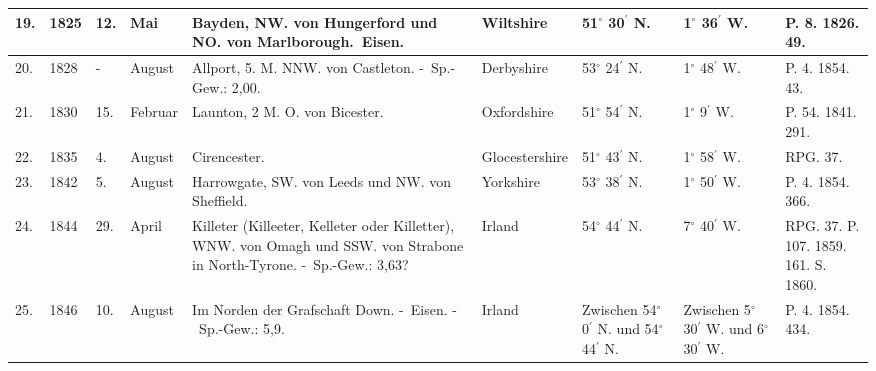 \documentclass[a4paper, 8pt, oneside, polutonikogreek, german]{article}
\begin{document}
\begin{center}
\begin{longtable}{|p{3mm}|p{6mm}|p{3mm}|p{10mm}|p{33mm}|p{20mm}|p{12mm}|p{12mm}|p{11mm}|}
        19. & 1825 & 12. & Mai & Bayden, NW. von Hungerford und NO. von Marlborough. Eisen. & Wiltshire & 51$^\circ$ 30$^\prime$ N. & 1$^\circ$ 36$^\prime$ W. & P. 8. 1826. 49. \\ \hline
        20. & 1828 & - & August & Allport, 5. M. NNW. von Castleton. - Sp.-Gew.: 2,00. & Derbyshire & 53$^\circ$ 24$^\prime$ N. & 1$^\circ$ 48$^\prime$ W. & P. 4. 1854. 43. \\ \hline
        21. & 1830 & 15. & Februar & Launton, 2 M. O. von Bicester. & Oxfordshire & 51$^\circ$ 54$^\prime$ N. & 1$^\circ$ 9$^\prime$ W. & P. 54. 1841. 291. \\ \hline
        22. & 1835 & 4. & August & Cirencester. & Glocestershire & 51$^\circ$ 43$^\prime$ N. & 1$^\circ$ 58$^\prime$ W. & RPG. 37. \\ \hline
        23. & 1842 & 5. & August & Harrowgate, SW. von Leeds und NW. von Sheffield. & Yorkshire & 53$^\circ$ 38$^\prime$ N. & 1$^\circ$ 50$^\prime$ W. & P. 4. 1854. 366. \\ \hline
        24. & 1844 & 29. & April & Killeter (Killeeter, Kelleter oder Killetter), WNW. von Omagh und SSW. von Strabone in North-Tyrone. - Sp.-Gew.: 3,63? & Irland & 54$^\circ$ 44$^\prime$ N. & 7$^\circ$ 40$^\prime$ W. & RPG. 37. P. 107. 1859. 161. S. 1860. \\ \hline
        25. & 1846 & 10. & August & Im Norden der Grafschaft Down. - Eisen. - Sp.-Gew.: 5,9. & Irland & Zwischen 54$^\circ$ 0$^\prime$ N. und 54$^\circ$ 44$^\prime$ N. & Zwischen 5$^\circ$ 30$^\prime$ W. und 6$^\circ$ 30$^\prime$ W. & P. 4. 1854. 434. \\ \hline
    \end{longtable}
\end{center}
\clearpage
\end{document}
